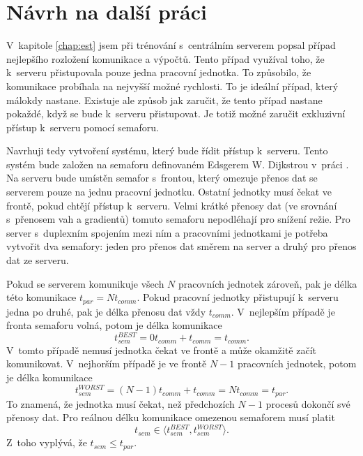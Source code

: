 \section{Návrh na další práci}
\label{sec:prop}

V~kapitole \ref{chap:est} jsem při trénování s~centrálním serverem popsal případ nejlepšího rozložení komunikace a výpočtů.
Tento případ využíval toho, že k~serveru přistupovala pouze jedna pracovní jednotka.
To způsobilo, že komunikace probíhala na nejvyšší možné rychlosti.
To je ideální případ, který málokdy nastane.
Existuje ale způsob jak zaručit, že tento případ nastane pokaždé, když se bude k~serveru přistupovat.
Je totiž možné zaručit exkluzivní přístup k~serveru pomocí semaforu.

Navrhuji tedy vytvoření systému, který bude řídit přístup k~serveru.
Tento systém bude založen na semaforu definovaném Edsgerem W. Dijkstrou v~práci \cite{Dijkstra2002}.
Na serveru bude umístěn semafor s~frontou, který omezuje přenos dat se serverem pouze na jednu pracovní jednotku.
Ostatní jednotky musí čekat ve frontě, pokud chtějí přístup k~serveru.
Velmi krátké přenosy dat (ve srovnání s~přenosem vah a gradientů) tomuto semaforu nepodléhají pro snížení režie.
Pro server s~duplexním spojením mezi ním a pracovními jednotkami je potřeba vytvořit dva semafory: jeden pro přenos dat směrem na server a druhý pro přenos dat ze serveru.

Pokud se serverem komunikuje všech $N$ pracovních jednotek zároveň, pak je délka této komunikace $t_{par}=Nt_{comm}$.
Pokud pracovní jednotky přistupují k~serveru jedna po druhé, pak je délka přenosu dat vždy $t_{comm}$.
V~nejlepším případě je fronta semaforu volná, potom je délka komunikace \begin{equation}t_{sem}^{BEST}=0t_{comm}+t_{comm}=t_{comm}.\end{equation}
V~tomto případě nemusí jednotka čekat ve frontě a může okamžitě začít komunikovat.
V~nejhorším případě je ve frontě $N-1$ pracovních jednotek, potom je délka komunikace \begin{equation}t_{sem}^{WORST}=(N-1)t_{comm}+t_{comm}=Nt_{comm}=t_{par}.\end{equation}
To znamená, že jednotka musí čekat, než předchozích $N-1$ procesů dokončí své přenosy dat.
Pro reálnou délku komunikace omezenou semaforem musí platit \begin{equation}t_{sem} \in \langle t_{sem}^{BEST}, t_{sem}^{WORST}\rangle.\end{equation}
Z~toho vyplývá, že $t_{sem} \leq t_{par}$.

